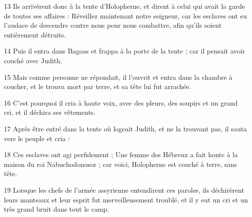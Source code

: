 \par 13 Ils arrivèrent donc à la tente d'Holopherne, et dirent à celui qui avait la garde de toutes ses affaires : Réveillez maintenant notre seigneur, car les esclaves ont eu l'audace de descendre contre nous pour nous combattre, afin qu'ils soient entièrement détruits.
\par 14 Puis il entra dans Bagoas et frappa à la porte de la tente ; car il pensait avoir couché avec Judith.
\par 15 Mais comme personne ne répondait, il l'ouvrit et entra dans la chambre à coucher, et le trouva mort par terre, et sa tête lui fut arrachée.
\par 16 C'est pourquoi il cria à haute voix, avec des pleurs, des soupirs et un grand cri, et il déchira ses vêtements.
\par 17 Après être entré dans la tente où logeait Judith, et ne la trouvant pas, il sauta vers le peuple et cria :
\par 18 Ces esclaves ont agi perfidement ; Une femme des Hébreux a fait honte à la maison du roi Nabuchodonosor ; car voici, Holopherne est couché à terre, sans tête.
\par 19 Lorsque les chefs de l'armée assyrienne entendirent ces paroles, ils déchirèrent leurs manteaux et leur esprit fut merveilleusement troublé, et il y eut un cri et un très grand bruit dans tout le camp.



